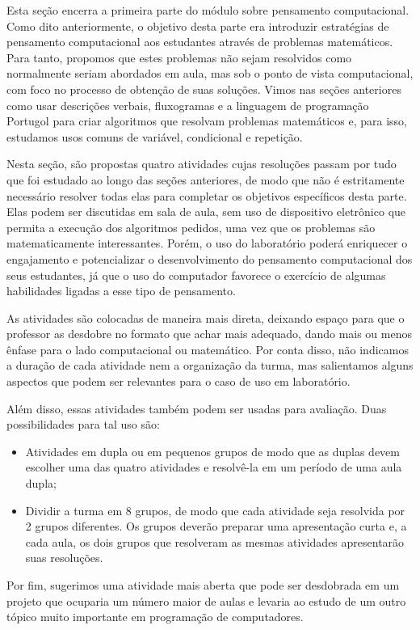 \clearmargin
\begin{texto}
{\def\currentcolor{session2}
	Esta seção encerra a primeira parte do módulo sobre pensamento computacional. Como dito anteriormente, o objetivo desta parte era introduzir estratégias de pensamento computacional aos estudantes através de problemas matemáticos. Para tanto, propomos que estes problemas não sejam resolvidos como normalmente seriam abordados em aula, mas sob o ponto de vista computacional, com foco no processo de obtenção de suas soluções. Vimos nas seções anteriores como usar descrições verbais, fluxogramas e a linguagem de programação Portugol para criar algoritmos que resolvam problemas matemáticos e, para isso, estudamos usos comuns de variável, condicional e repetição.

	Nesta seção, são propostas quatro atividades cujas resoluções passam por tudo que foi estudado ao longo das seções anteriores, de modo que não é estritamente necessário resolver todas elas para completar os objetivos específicos desta parte. Elas podem ser discutidas em sala de aula, sem uso de dispositivo eletrônico que permita a execução dos algoritmos pedidos, uma vez que os problemas são matematicamente interessantes. Porém, o uso do laboratório poderá enriquecer o engajamento e potencializar o desenvolvimento do pensamento computacional dos seus estudantes, já que o uso do computador favorece o exercício de algumas habilidades ligadas a esse tipo de pensamento.

	As atividades são colocadas de maneira mais direta, deixando espaço para que o professor as desdobre no formato que achar mais adequado, dando mais ou menos ênfase para o lado computacional ou matemático. Por conta disso, não indicamos a duração de cada atividade nem a organização da turma, mas salientamos alguns aspectos que podem ser relevantes para o caso de uso em laboratório.

	Além disso, essas atividades também podem ser usadas para avaliação. Duas possibilidades para tal uso são:

	\begin{itemize}[topsep=0pt]
	\item Atividades em dupla ou em pequenos grupos de modo que as duplas devem escolher uma das quatro atividades e resolvê-la em um período de uma aula dupla;

	\item Dividir a turma em 8 grupos, de modo que cada atividade seja resolvida por 2 grupos diferentes. Os grupos deverão preparar uma apresentação curta e, a cada aula, os dois grupos que resolveram as mesmas atividades apresentarão suas resoluções.
	\end{itemize}

	Por fim, sugerimos uma atividade mais aberta que pode ser desdobrada em um projeto que ocuparia um número maior de aulas e levaria ao estudo de um outro tópico muito importante em programação de computadores.
}
\end{texto}


